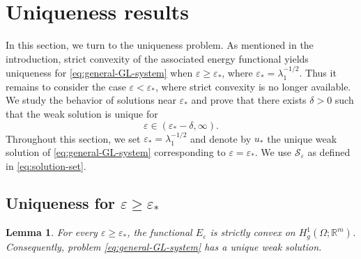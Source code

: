 \documentclass[11pt]{amsart}
\theoremstyle{definition}
\theoremstyle{plain}
\newtheorem{lemma}[theorem]{Lemma}
\newcommand{\R}{\mathbb{R}}
\numberwithin{equation}{section}
\begin{document}
\section{Uniqueness results}

In this section, we turn to the uniqueness problem. As mentioned in the
introduction, strict convexity of the associated energy functional yields
uniqueness for \eqref{eq:general-GL-system} when
$\varepsilon\geq\varepsilon_*$, where
$\varepsilon_*=\lambda_1^{-1/2}$. Thus it remains to consider the case
$\varepsilon<\varepsilon_*$, where strict convexity is no longer
available. We study the behavior of solutions near $\varepsilon_*$ and
prove that there exists $\delta>0$ such that the weak solution is unique
for
\[
\varepsilon\in(\varepsilon_*-\delta,\infty).
\]
Throughout this section, we set
$\varepsilon_*=\lambda_1^{-1/2}$ and denote by $u_*$ the unique weak
solution of \eqref{eq:general-GL-system} corresponding to
$\varepsilon=\varepsilon_*$. We use $\mathcal{S}_\varepsilon$ as defined
in \eqref{eq:solution-set}.


\subsection{Uniqueness for $\varepsilon\geq\varepsilon_*$}


\begin{lemma}\label{lem:convexity-threshold}
	For every $\varepsilon\geq\varepsilon_*$, the functional
	$E_\varepsilon$ is strictly convex on
	$H_g^1(\Omega;\R^m)$. Consequently,
	problem \eqref{eq:general-GL-system} has a unique weak solution.
\end{lemma}
\end{document}
